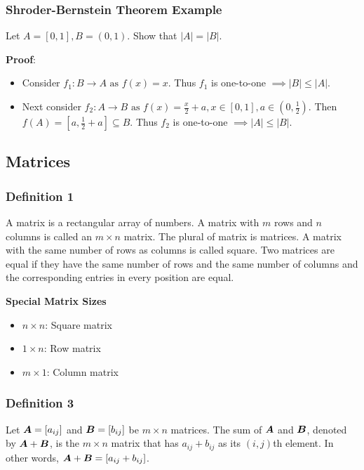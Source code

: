 \documentclass{article}
\begin{document}
\subsubsection{Shroder-Bernstein Theorem Example}

Let $ A = [0, 1], B = (0, 1) $. Show that $ |A| = |B| $.

\textbf{Proof}:
\begin{itemize}
	\item Consider $ f_1: B \rightarrow A \text{ as } f(x) = x $. Thus $ f_1 $ is one-to-one $ \implies |B| \leq |A| $.

	\item Next consider $ f_2: A \rightarrow B \text{ as } f(x) = \frac{ x }{ 2 } + a, x \in \left[ 0, 1 \right], a \in \left( 0, \frac{ 1 }{ 2 } \right) $. Then $ f(A) = \left[ a, \frac{ 1 }{ 2 } + a \right] \subseteq B $. Thus $ f_2 $ is one-to-one $ \implies |A| \leq |B| $.
\end{itemize}

\subsection{Matrices}

\subsubsection{Definition 1}

A matrix is a rectangular array of numbers. A matrix with $ m $ rows and $ n $ columns is called an $ m \times n $ matrix. The plural of matrix is matrices. A matrix with the same number of rows as columns is called square. Two matrices are equal if they have the same number of rows and the same number of columns and the corresponding entries in every position are equal.

\textbf{Special Matrix Sizes}
\begin{itemize}
	\item $ n \times n $: Square matrix
	\item $ 1 \times n $: Row matrix
	\item $ m \times 1 $: Column matrix
\end{itemize}

\subsubsection{Definition 3}

Let $ \matr{A} = \left[ a_{ij} \right] $ and $ \matr{B} = \left[ b_{ij} \right] $ be $ m \times n $ matrices. The sum of $ \matr{A} $ and $ \matr{B} $, denoted by $ \matr{A} + \matr{B} $, is the $ m \times n $ matrix that has $ a_{ij} + b_{ij} $ as its $ (i, j) $th element. In other words, $ \matr{A} + \matr{B} = \left[ a_{ij} + b_{ij} \right] $.
\end{document}
